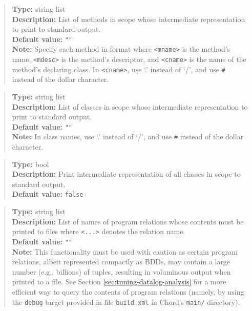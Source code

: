 \noindent {}
\begin{quote}
{\bf Type:} string list  \\
{\bf Description:} List of methods in scope whose intermediate representation to print to standard output. \\
{\bf Default value:} {\tt ""} \\
{\bf Note:} Specify each method in format  where {\tt <mname>} is the method's name, {\tt <mdesc>} is the method's descriptor, and {\tt <cname>} is the name of the method's declaring class. In {\tt <cname>}, use `.' instead of `/', and use {\tt \#} instead of the dollar character. 
\end{quote}

\noindent {}
\begin{quote}
{\bf Type:} string list  \\
{\bf Description:} List of classes in scope whose intermediate representation to print to standard output. \\
{\bf Default value:} {\tt ""} \\
{\bf Note:} In class names, use `.' instead of `/', and use {\tt \#} instead of the dollar character. 
\end{quote}

\noindent {}
\begin{quote}
{\bf Type:} bool \\
{\bf Description:} Print intermediate representation of all classes in scope to standard output. \\
{\bf Default value:} {\tt false}
\end{quote}

\noindent {}
\begin{quote}
{\bf Type:} string list  \\
{\bf Description:} List of names of program relations whose contents must be printed to files  where {\tt <...>} denotes the relation name. \\
{\bf Default value:} {\tt ""} \\
{\bf Note:} This functionality must be used with caution as certain program relations, albeit represented compactly as BDDs, may contain a large number (e.g., billions) of tuples, resulting in voluminous output when printed to a file.  See Section \ref{sec:tuning-datalog-analysis} for a more efficient way to query the contents of program relations (namely, by using the {\tt debug} target provided in file {\tt build.xml} in Chord's {\tt main/} directory). 
\end{quote}

